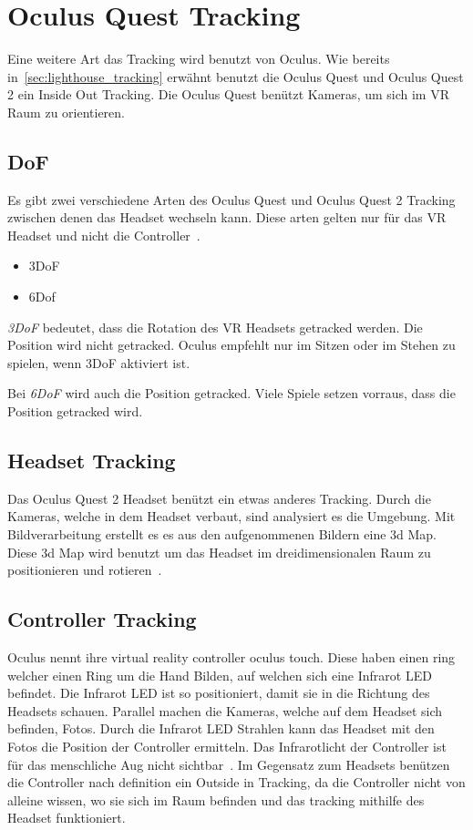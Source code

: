 \section{Oculus Quest Tracking}
\label{sec:oculus_quest_tracking}

Eine weitere Art das Tracking wird benutzt von Oculus.
Wie bereits in~\ref{sec:lighthouse_tracking} erwähnt benutzt die Oculus Quest und Oculus Quest 2 ein Inside Out Tracking.
Die Oculus Quest benützt Kameras, um sich im VR Raum zu orientieren.

\subsection{DoF}

Es gibt zwei verschiedene Arten des Oculus Quest und Oculus Quest 2 Tracking zwischen denen das Headset wechseln kann.
Diese arten gelten nur für das VR Headset und nicht die Controller~\cite{oculus_support_headset_tracking}.

\begin{itemize}
    \item 3DoF
    \item 6Dof
\end{itemize}

\emph{3DoF} bedeutet, dass die Rotation des VR Headsets getracked werden.
Die Position wird nicht getracked.
Oculus empfehlt nur im Sitzen oder im Stehen zu spielen, wenn 3DoF aktiviert ist.

Bei \emph{6DoF} wird auch die Position getracked.
Viele Spiele setzen vorraus, dass die Position getracked wird.

\subsection{Headset Tracking}

Das Oculus Quest 2 Headset benützt ein etwas anderes Tracking.
Durch die Kameras, welche in dem Headset verbaut, sind analysiert es die Umgebung.
Mit Bildverarbeitung erstellt es es aus den aufgenommenen Bildern eine 3d Map.
Diese 3d Map wird benutzt um das Headset im dreidimensionalen Raum zu positionieren und rotieren~\cite{MECHATECH}.

\subsection{Controller Tracking}

Oculus nennt ihre virtual reality controller oculus touch.
Diese haben einen ring welcher einen Ring um die Hand Bilden, auf welchen sich eine Infrarot LED befindet.
Die Infrarot LED ist so positioniert, damit sie in die Richtung des Headsets schauen.
Parallel machen die Kameras, welche auf dem Headset sich befinden, Fotos.
Durch die Infrarot LED Strahlen kann das Headset mit den Fotos die Position der Controller ermitteln.
Das Infrarotlicht der Controller ist für das menschliche Aug nicht sichtbar~\cite{Gajsek_2022}.
Im Gegensatz zum Headsets benützen die Controller nach definition ein Outside in Tracking, da die Controller nicht von alleine wissen, wo sie sich im Raum befinden und das tracking mithilfe des Headset funktioniert.

